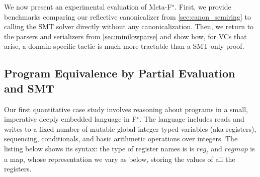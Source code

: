\documentclass[runningheads]{llncs}
\newcommand\fstar{F$^\star$\xspace}
\newcommand\metafstar{Meta-F$^\star$\xspace}
\newcommand{\comm}[3]{\ifcheckpagebudget\else\ifdraft{{\color{#1}[#2: #3]}}\fi\fi}
\newcommand{\ch}[1]{\comm{teal}{CH}{#1}}
\begin{document}
We now present an experimental evaluation of \metafstar.
%
%
First, we provide benchmarks comparing our reflective canonicalizer
from \autoref{sec:canon_semiring} to calling the SMT solver directly
without any canonicalization.
%
%
Then, we return to the parsers and serializers from
\autoref{sec:minilowparse} and show
how, for VCs that arise, a domain-specific tactic is much more
tractable than a SMT-only proof.
%






\iffalse
\subsection{Program Equivalence by Partial Evaluation and SMT}
\label{sec:registers}

Our first quantitative case study involves reasoning about programs in
a small, imperative deeply embedded language in \fstar.
%
The language includes reads and writes to a fixed number of mutable
global integer-typed variables (aka registers), sequencing,
conditionals, and basic arithmetic operations over integers.
%
The listing below shows its syntax: the type of register names is
is \ls$reg_t$ and \ls$regmap$ is a map, whose representation we vary as below,
storing the values of all the
registers.
%
\end{document}
